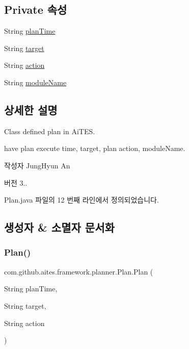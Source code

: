 \subsection*{Private 속성}
\begin{DoxyCompactItemize}
\item 
String \mbox{\hyperlink{classcom_1_1github_1_1aites_1_1framework_1_1planner_1_1_plan_a4729359a276d3dda6350a16233754f9e}{plan\+Time}}
\item 
String \mbox{\hyperlink{classcom_1_1github_1_1aites_1_1framework_1_1planner_1_1_plan_a3f45ee392c1af51834376a138bf8f325}{target}}
\item 
String \mbox{\hyperlink{classcom_1_1github_1_1aites_1_1framework_1_1planner_1_1_plan_a7b7babde3735425a6e14a679bff3150c}{action}}
\item 
String \mbox{\hyperlink{classcom_1_1github_1_1aites_1_1framework_1_1planner_1_1_plan_af8678b070e1722253962bbf65805857f}{module\+Name}}
\end{DoxyCompactItemize}


\subsection{상세한 설명}
Class defined plan in Ai\+T\+ES. 

have plan execute time, target, plan action, module\+Name. \begin{DoxyAuthor}{작성자}
Jung\+Hyun An 
\end{DoxyAuthor}
\begin{DoxyVersion}{버전}
3.. 
\end{DoxyVersion}


Plan.\+java 파일의 12 번째 라인에서 정의되었습니다.



\subsection{생성자 \& 소멸자 문서화}
\mbox{\label{classcom_1_1github_1_1aites_1_1framework_1_1planner_1_1_plan_a2a4e43ba9fcdf4f632ad3c297e3cbbc1}} 
\subsubsection{\texorpdfstring{Plan()}{Plan()}}
{\footnotesize\ttfamily com.\+github.\+aites.\+framework.\+planner.\+Plan.\+Plan (\begin{DoxyParamCaption}\item[{String}]{plan\+Time,  }\item[{String}]{target,  }\item[{String}]{action }\end{DoxyParamCaption})}



